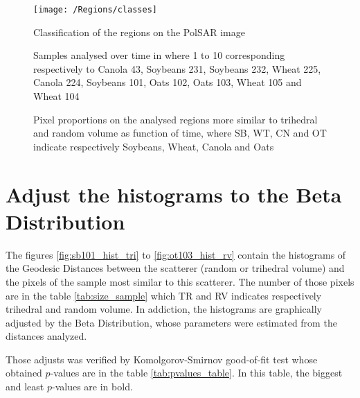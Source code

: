 \documentclass[12pt]{article}
\begin{document}
\begin{figure}[!h]
\centering
\texttt{[image: /Regions/classes]}
\label{fig:classes}
\caption{Classification of the regions on the PolSAR image}
\end{figure}

\begin{figure}[!h]
\centering


\caption{Samples analysed over time in where 1 to 10 corresponding respectively to Canola 43, Soybeans 231, Soybeans 232, Wheat 225, Canola 224, Soybeans 101, Oats 102, Oats 103, Wheat 105 and Wheat 104}
\label{fig:regions}
\end{figure}

\begin{figure}[!h]
\centering
{}
\caption{Pixel proportions on the analysed regions more similar to trihedral and random volume as function of time, where SB, WT, CN and OT indicate respectively Soybeans, Wheat, Canola and Oats}
\label{fig:pixel_proportions}
\end{figure}

\newpage

\section{Adjust the histograms to the Beta Distribution}

The figures \ref{fig:sb101_hist_tri} to \ref{fig:ot103_hist_rv} contain the histograms of the Geodesic Distances between the scatterer (random or trihedral volume) and the pixels of the sample most similar to this scatterer.
The number of those pixels are in the table \ref{tab:size_sample} which TR and RV indicates respectively trihedral and random volume. In addiction, the histograms are graphically adjusted by the Beta Distribution, whose parameters were estimated from the distances analyzed.

Those adjusts was verified by Komolgorov-Smirnov good-of-fit test whose obtained $p$-values are in the table \ref{tab:pvalues_table}. In this table, the biggest and least $p$-values are in bold.
\end{document}
